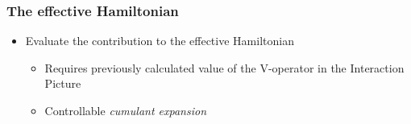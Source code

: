     \begin{frame}[t]
        \frametitle{The effective Hamiltonian}

        \begin{itemize}
            \item Evaluate the contribution to the effective Hamiltonian \pause
            \begin{itemize}
                \item Requires previously calculated value of the V-operator in the Interaction Picture \pause
                \item Controllable \emph{cumulant expansion}
            \end{itemize}
        \end{itemize}

        \pause[2]
        \vspace{0.2cm}

        \onslide %
    \end{frame}

